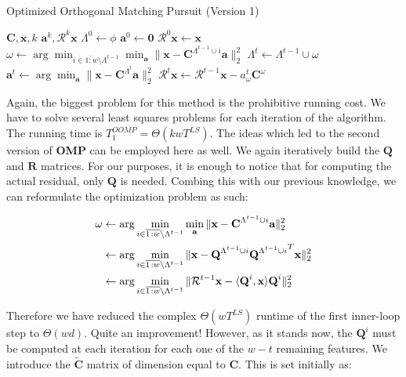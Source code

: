 \documentclass[12pt,a4paper,oneside,english]{UPBThesis}
\newcommand{\hcrange}[2]{\overline{{#1}\colon\!\!{#2}}}
\begin{document}
\begin{algorithm}
\caption{Optimized Orthogonal Matching Pursuit (Version 1)}
\label{algo:OptimizedOrthogonalMatchingPursuitMethodV1}
\begin{algorithmic}
\Require $\textbf{C},\textbf{x},k$
\Ensure $\textbf{a}^k,\mathcal{R}^k\textbf{x}$
\State $\Lambda^0 \gets \phi$
\State $\textbf{a}^0 \gets \textbf{0}$
\State $\mathcal{R}^0\textbf{x} \gets \textbf{x}$
\For {$t = \hcrange{1}{k}$}
\State $\omega \gets \arg \min_{i \in \hcrange{1}{w} \setminus \Lambda^{t-1}} \min_{\textbf{a}} {\| \textbf{x} - \textbf{C}^{\Lambda^{t-1} \cup i}\textbf{a} \|_2^2}$
\State $\Lambda^t \gets \Lambda^{t-1} \cup \omega$
\State $\textbf{a}^t \gets \arg\min_{\textbf{a}} {\| \textbf{x} - \textbf{C}^{\Lambda^t}\textbf{a} \|_2^2}$
\State $\mathcal{R}^t\textbf{x} \gets \mathcal{R}^{t-1}\textbf{x} - a_\omega^t\textbf{C}^\omega$
\EndFor
\end{algorithmic}
\end{algorithm}

Again, the biggest problem for this method is the prohibitive running cost. We have to solve several least squares problems for each iteration of the algorithm. The running time is $T_1^{OOMP} = \Theta(kwT^{LS})$. The ideas which led to the second version of \textbf{OMP} can be employed here as well. We again iteratively build the $\textbf{Q}$ and $\textbf{R}$ matrices. For our purposes, it is enough to notice that for computing the actual residual, only $\textbf{Q}$ is needed. Combing this with our previous knowledge, we can reformulate the optimization problem as such:

\begin{align*}
\omega & \gets \arg\min_{i \in \hcrange{1}{w} \setminus \Lambda^{t-1}} \min_\textbf{a} \| \textbf{x} - \textbf{C}^{\Lambda^{t-1} \cup i}\textbf{a} \|_2^2 \\
& \gets \arg\min_{i \in \hcrange{1}{w} \setminus \Lambda^{t-1}} \| \textbf{x} - \textbf{Q}^{\Lambda^{t-1} \cup i}{\textbf{Q}^{\Lambda^{t-1} \cup i}}^T\textbf{x} \|_2^2 \\
& \gets \arg\min_{i \in \hcrange{1}{w} \setminus \Lambda^{t-1}} \| \mathcal{R}^{t-1}\textbf{x} - \langle \textbf{Q}^i, \textbf x \rangle \textbf{Q}^i \|_2^2
\end{align*}

Therefore we have reduced the complex $\Theta(wT^{LS})$ runtime of the first inner-loop step to $\Theta(wd)$. Quite an improvement! However, as it stands now, the $\textbf{Q}^i$ must be computed at each iteration for each one of the $w - t$ remaining features. We introduce the $\tilde{\textbf{C}}$ matrix of dimension equal to $\textbf{C}$. This is set initially as:
\end{document}
